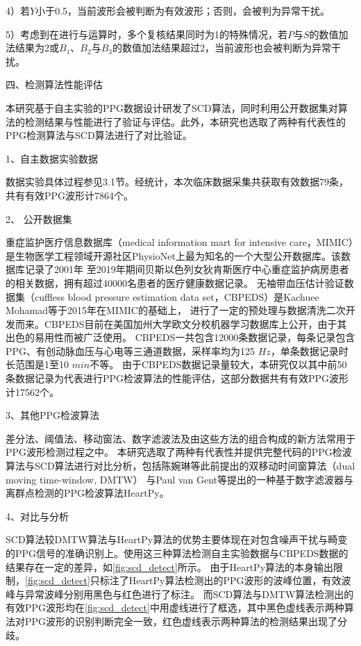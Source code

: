 4）若$Y$小于0.5，当前波形会被判断为有效波形；否则，会被判为异常干扰。

5）考虑到在进行与运算时，多个复核结果同时为1的特殊情况，若$P$与$S$的数值加法结果为2或$B_1$、$B_2$与$B_3$的数值加法结果超过2，当前波形也会被判断为异常干扰。

四、检测算法性能评估

本研究基于自主实验的PPG数据设计研发了SCD算法，同时利用公开数据集对算法的检测结果与性能进行了验证与评估。此外，本研究也选取了两种有代表性的PPG检测算法与SCD算法进行了对比验证。

1、自主数据实验数据

数据实验具体过程参见3.1节。经统计，本次临床数据采集共获取有效数据79条，共有有效PPG波形计7864个。

2、 公开数据集

重症监护医疗信息数据库（medical information mart for intensive care，MIMIC）是生物医学工程领域开源社区PhysioNet上最为知名的一个大型公开数据库\cite{mit2022,Goldberger2000,johnson2018mimic,mimic4}。该数据库记录了2001年
至2019年期间贝斯以色列女狄肯斯医疗中心重症监护病房患者的相关数据，拥有超过40000名患者的医疗健康数据记录\cite{johnson2018mimic}。
无袖带血压估计验证数据集（cuffless blood pressure estimation data set，CBPEDS）是Kachuee Mohamad等\cite{Kachuee2015,ucibp2022}于2015年在MIMIC的基础上，
进行了一定的预处理与数据清洗二次开发而来。CBPEDS目前在美国加州大学欧文分校机器学习数据库上公开，由于其出色的易用性而被广泛使用。
CBPEDS一共包含12000条数据记录，每条记录包含PPG、有创动脉血压与心电等三通道数据，采样率均为125 $Hz$，单条数据记录时长范围是1至10 $min$不等。
由于CBPEDS数据记录量较大，本研究仅以其中前50条数据记录为代表进行PPG检波算法的性能评估，这部分数据共有有效PPG波形计17562个。

3、其他PPG检波算法

差分法、阈值法、移动窗法、数字滤波法及由这些方法的组合构成的新方法常用于PPG波形检测过程之中\cite{Chen2019,cwl,Chen2021,ChenH2019,QYY2008,SJ2007,van2019,van20192}。
本研究选取了两种有代表性并提供完整代码的PPG检波算法与SCD算法进行对比分析，包括陈婉琳等\cite{Chen2019,cwl}此前提出的双移动时间窗算法（dual moving time-window, DMTW）
与Paul van Gent等\cite{van2019,van20192}提出的一种基于数字滤波器与离群点检测的PPG检波算法HeartPy。

4、对比与分析

SCD算法较DMTW算法与HeartPy算法的优势主要体现在对包含噪声干扰与畸变的PPG信号的准确识别上。使用这三种算法检测自主实验数据与CBPEDS数据的结果存在一定的差异，如\autoref{fig:scd_detect}所示。
由于HeartPy算法的本身输出限制，\autoref{fig:scd_detect}只标注了HeartPy算法检测出的PPG波形的波峰位置，有效波峰与异常波峰分别用黑色与红色进行了标注。
而SCD算法与DMTW算法检测出的有效PPG波形均在\autoref{fig:scd_detect}中用虚线进行了框选，其中黑色虚线表示两种算法对PPG波形的识别判断完全一致，红色虚线表示两种算法的检测结果出现了分歧。

